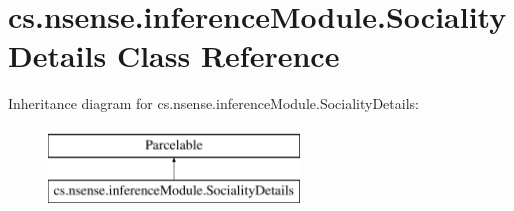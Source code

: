 \hypertarget{classcs_1_1nsense_1_1inference_module_1_1_sociality_details}{\section{cs.\-nsense.\-inference\-Module.\-Sociality\-Details Class Reference}
\label{classcs_1_1nsense_1_1inference_module_1_1_sociality_details}
}
Inheritance diagram for cs.\-nsense.\-inference\-Module.\-Sociality\-Details\-:\begin{figure}[H]
\begin{center}
\leavevmode
\includegraphics[height=2.000000cm]{classcs_1_1nsense_1_1inference_module_1_1_sociality_details}
\end{center}
\end{figure}
